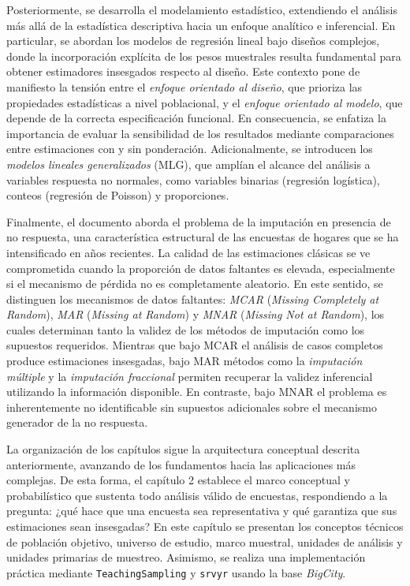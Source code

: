 \documentclass[
  spanish,
  12pt,
]{book}
\begin{document}
Posteriormente, se desarrolla el modelamiento estadístico, extendiendo el análisis más allá de la estadística descriptiva hacia un enfoque analítico e inferencial. En particular, se abordan los modelos de regresión lineal bajo diseños complejos, donde la incorporación explícita de los pesos muestrales resulta fundamental para obtener estimadores insesgados respecto al diseño. Este contexto pone de manifiesto la tensión entre el \emph{enfoque orientado al diseño}, que prioriza las propiedades estadísticas a nivel poblacional, y el \emph{enfoque orientado al modelo}, que depende de la correcta especificación funcional. En consecuencia, se enfatiza la importancia de evaluar la sensibilidad de los resultados mediante comparaciones entre estimaciones con y sin ponderación. Adicionalmente, se introducen los \emph{modelos lineales generalizados} (MLG), que amplían el alcance del análisis a variables respuesta no normales, como variables binarias (regresión logística), conteos (regresión de Poisson) y proporciones.

Finalmente, el documento aborda el problema de la imputación en presencia de no respuesta, una característica estructural de las encuestas de hogares que se ha intensificado en años recientes. La calidad de las estimaciones clásicas se ve comprometida cuando la proporción de datos faltantes es elevada, especialmente si el mecanismo de pérdida no es completamente aleatorio. En este sentido, se distinguen los mecanismos de datos faltantes: \emph{MCAR} (\emph{Missing Completely at Random}), \emph{MAR} (\emph{Missing at Random}) y \emph{MNAR} (\emph{Missing Not at Random}), los cuales determinan tanto la validez de los métodos de imputación como los supuestos requeridos. Mientras que bajo MCAR el análisis de casos completos produce estimaciones insesgadas, bajo MAR métodos como la \emph{imputación múltiple} \citep{vanbuuren2012flexible} y la \emph{imputación fraccional} \citep{kim2004fractional} permiten recuperar la validez inferencial utilizando la información disponible. En contraste, bajo MNAR el problema es inherentemente no identificable sin supuestos adicionales sobre el mecanismo generador de la no respuesta.

La organización de los capítulos sigue la arquitectura conceptual descrita anteriormente, avanzando de los fundamentos hacia las aplicaciones más complejas. De esta forma, el capítulo 2 establece el marco conceptual y probabilístico que sustenta todo análisis válido de encuestas, respondiendo a la pregunta: ¿qué hace que una encuesta sea representativa y qué garantiza que sus estimaciones sean insesgadas? En este capítulo se presentan los conceptos técnicos de población objetivo, universo de estudio, marco muestral, unidades de análisis y unidades primarias de muestreo. Asimismo, se realiza una implementación práctica mediante \texttt{TeachingSampling} y \texttt{srvyr} usando la base \emph{BigCity}.
\end{document}
